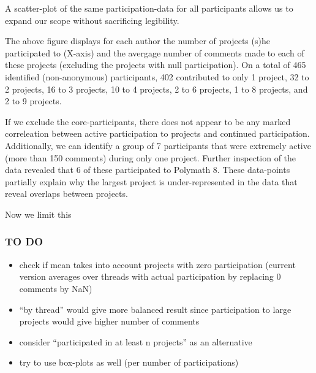 \documentclass[article, floatfix, groupaddress, prb]{revtex4-1}
\providecommand{\tightlist}{%
      \setlength{\itemsep}{0pt}\setlength{\parskip}{0pt}}
\begin{document}
A scatter-plot of the same participation-data for all participants
allows us to expand our scope without sacrificing legibility.





    \begin{figure}
        \begin{center}\end{center}
        \caption{}
        \label{}
    \end{figure}
    
    The above figure displays for each author the number of projects (s)he
participated to (X-axis) and the avergage number of comments made to
each of these projects (excluding the projects with null participation).
On a total of 465 identified (non-anonymous) participants, 402
contributed to only 1 project, 32 to 2 projects, 16 to 3 projects, 10 to
4 projects, 2 to 6 projects, 1 to 8 projects, and 2 to 9 projects.

If we exclude the core-participants, there does not appear to be any
marked correleation between active participation to projects and
continued participation. Additionally, we can identify a group of 7
participants that were extremely active (more than 150 comments) during
only one project. Further inspection of the data revealed that 6 of
these participated to Polymath 8. These data-points partially explain
why the largest project is under-represented in the data that reveal
overlaps between projects.

    Now we limit this

    \subsubsection{TO DO}\label{to-do}

\begin{itemize}
\tightlist
\item
  check if mean takes into account projects with zero participation
  (current version averages over threads with actual participation by
  replacing 0 comments by NaN)
\item
  ``by thread'' would give more balanced result since participation to
  large projects would give higher number of comments
\item
  consider ``participated in at least n projects'' as an alternative
\item
  try to use box-plots as well (per number of participations)
\end{itemize}
\end{document}
